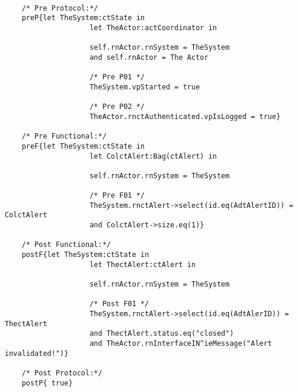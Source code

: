 	\scriptsize
	\vspace{0.5cm}
	\begin{lstlisting}[style=MessirStyle,firstnumber=auto,captionpos=b,caption={\msrmessir (MCL-oriented) specification of the operation \emph{oeInvalidateAlert}.},label=OM-actCoordinator-oeInvalidateAlert-MCL-LST]

	/* Pre Protocol:*/ 
	preP{let TheSystem:ctState in
					let TheActor:actCoordinator in
					
					self.rnActor.rnSystem = TheSystem
					and self.rnActor = The Actor
					
					/* Pre P01 */
					TheSystem.vpStarted = true
					
					/* Pre P02 */
					TheActor.rnctAuthenticated.vpIsLogged = true}
	
	/* Pre Functional:*/
	preF{let TheSystem:ctState in
					let ColctAlert:Bag(ctAlert) in
				
					self.rnActor.rnSystem = TheSystem
				
					/* Pre F01 */
					TheSystem.rnctAlert->select(id.eq(AdtAlertID)) = ColctAlert
					and ColctAlert->size.eq(1)}
	
	/* Post Functional:*/ 
	postF{let TheSystem:ctState in
					let ThectAlert:ctAlert in
				
					self.rnActor.rnSystem = TheSystem
				
					/* Post F01 */
					TheSystem.rnctAlert->select(id.eq(AdtAlerID)) = ThectAlert
					and ThectAlert.status.eq("closed")
					and TheActor.rnInterfaceIN^ieMessage("Alert invalidated!")}
	
	/* Post Protocol:*/ 
	postP{ true}
	
	\end{lstlisting}
	\normalsize 
	
	
	
	





